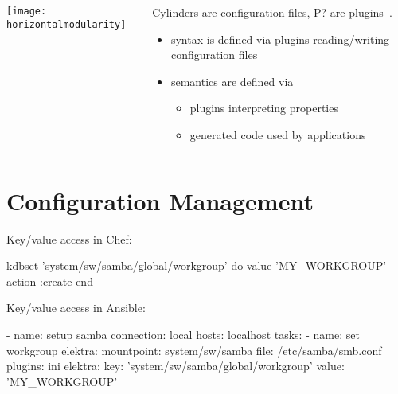 \begin{frame}
	\begin{columns}[c]
	\begin{column}{7cm}
	\texttt{[image: horizontalmodularity]}
	\end{column}
	\begin{column}{4cm}
	Cylinders are configuration files, P? are plugins~\cite{raab2016improving}.

	\begin{itemize}
	\item syntax is defined via plugins reading/writing configuration files
	\item semantics are defined via
		\begin{itemize}
		\item plugins interpreting properties
		\item generated code used by applications
		\end{itemize}
	\end{itemize}
	\end{column}
	\end{columns}
\end{frame}

\section{Configuration Management}

\begin{frame}[fragile]
	Key/value access in Chef:

	\begin{code}[morekeywords={kdbset,do,action,value,end},gobble=4]
	kdbset 'system/sw/samba/global/workgroup' do
		value 'MY_WORKGROUP'
		action :create
	end
	\end{code}
\end{frame}

\begin{frame}[fragile]
	Key/value access in Ansible:

	\begin{code}[morekeywords={name,connection,key,value,elektra,mountpoint,file,plugins,hosts,tasks},gobble=4]
	- name: setup samba
	  connection: local
	  hosts: localhost
	  tasks:
	  - name: set workgroup
	    elektra:
	      mountpoint: system/sw/samba
	      file: /etc/samba/smb.conf
	      plugins: ini
	    elektra:
	      key: 'system/sw/samba/global/workgroup'
	      value: 'MY_WORKGROUP'
	\end{code}
\end{frame}

